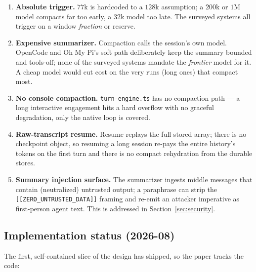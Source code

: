 \documentclass[11pt]{article}
\begin{document}
\begin{enumerate}[leftmargin=1.6em]
\item \textbf{Absolute trigger.} $77$k is hardcoded to a $128$k assumption; a
$200$k or $1$M model compacts far too early, a $32$k model too late. The
surveyed systems all trigger on a window \emph{fraction} or reserve.
\item \textbf{Expensive summarizer.} Compaction calls the session's own model.
OpenCode and Oh My Pi's soft path deliberately keep the summary bounded and
tools-off; none of the surveyed systems mandate the \emph{frontier} model for
it. A cheap model would cut cost on the very runs (long ones) that compact most.
\item \textbf{No console compaction.} \texttt{turn-engine.ts} has no compaction
path --- a long interactive engagement hits a hard overflow with no graceful
degradation, only the native loop is covered.
\item \textbf{Raw-transcript resume.} Resume replays the full stored array; there
is no checkpoint object, so resuming a long session re-pays the entire history's
tokens on the first turn and there is no compact rehydration from the durable
stores.
\item \textbf{Summary injection surface.} The summarizer ingests middle messages
that contain (neutralized) untrusted output; a paraphrase can strip the
\texttt{[[ZERO\_UNTRUSTED\_DATA]]} framing and re-emit an attacker imperative as
first-person agent text. This is addressed in Section~\ref{sec:security}.
\end{enumerate}

\subsection{Implementation status (2026-08)}

The first, self-contained slice of the design has shipped, so the paper tracks
the code:
\end{document}
